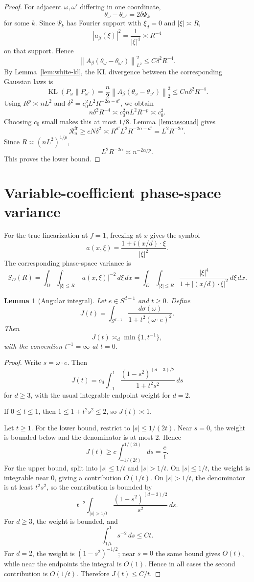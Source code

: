 \documentclass[12pt]{article}
\newtheorem{lemma}[theorem]{Lemma}
\theoremstyle{remark}
\DeclareMathOperator{\KL}{KL}
\newcommand{\norm}[1]{\left\lVert #1\right\rVert}
\newcommand{\asym}{\asymp}
\begin{document}
\begin{proof}
For adjacent \(\omega,\omega'\) differing in one coordinate,
\[
\theta_\omega-\theta_{\omega'}=2\delta\Psi_k
\]
for some \(k\). Since \(\Psi_k\) has Fourier support with \(\xi_d=0\) and \(|\xi|\asym R\),
\[
|a_\beta(\xi)|^2
=
\frac1{|\xi|^4}
\asym R^{-4}
\]
on that support. Hence
\[
\norm{A_\beta(\theta_\omega-\theta_{\omega'})}_{L^2}^2
\le
C\delta^2R^{-4}.
\]
By Lemma~\ref{lem:white-kl}, the KL divergence between the corresponding Gaussian laws is
\[
\KL(P_\omega\|P_{\omega'})
=
\frac n2
\norm{A_\beta(\theta_\omega-\theta_{\omega'})}_2^2
\le
C n\delta^2R^{-4}.
\]
Using \(R^p\asym nL^2\) and \(\delta^2=c_0^2L^2R^{-2\alpha-d'}\), we obtain
\[
n\delta^2R^{-4}
\asym
c_0^2 nL^2R^{-p}
\asym
c_0^2.
\]
Choosing \(c_0\) small makes this at most \(1/8\). Lemma~\ref{lem:assouad} gives
\[
\mathcal R_n^{\mathrm{fr}}
\ge
cN\delta^2
\asym
R^{d'}L^2R^{-2\alpha-d'}
=
L^2R^{-2\alpha}.
\]
Since \(R\asym (nL^2)^{1/p}\),
\[
L^2R^{-2\alpha}
\asym
n^{-2\alpha/p}.
\]
This proves the lower bound.
\end{proof}

\section{Variable-coefficient phase-space variance}
\label{sec:variable-variance}

For the true linearization at \(f=1\), freezing at \(x\) gives the symbol
\[
a(x,\xi)=\frac{1+i(x/d)\cdot\xi}{|\xi|^2}.
\]
The corresponding phase-space variance is
\[
S_D(R)
=
\int_D\int_{|\xi|\le R}
|a(x,\xi)|^{-2}\,d\xi\,dx
=
\int_D\int_{|\xi|\le R}
\frac{|\xi|^4}{1+|(x/d)\cdot\xi|^2}\,d\xi\,dx.
\]

\begin{lemma}[Angular integral]
\label{lem:angular-integral}
Let \(e\in S^{d-1}\) and \(t\ge0\). Define
\[
J(t)=\int_{S^{d-1}}\frac{d\sigma(\omega)}{1+t^2(\omega\cdot e)^2}.
\]
Then
\[
J(t)\asym_d \min\{1,t^{-1}\},
\]
with the convention \(t^{-1}=\infty\) at \(t=0\).
\end{lemma}
\begin{proof}
Write \(s=\omega\cdot e\). Then
\[
J(t)=c_d\int_{-1}^1
\frac{(1-s^2)^{(d-3)/2}}{1+t^2s^2}\,ds
\]
for \(d\ge3\), with the usual integrable endpoint weight for \(d=2\).

If \(0\le t\le1\), then \(1\le1+t^2s^2\le2\), so \(J(t)\asym1\).

Let \(t\ge1\). For the lower bound, restrict to \(|s|\le1/(2t)\). Near \(s=0\), the weight is bounded below and the denominator is at most \(2\). Hence
\[
J(t)\ge c\int_{-1/(2t)}^{1/(2t)}ds=\frac{c}{t}.
\]
For the upper bound, split into \(|s|\le1/t\) and \(|s|>1/t\). On \(|s|\le1/t\), the weight is integrable near \(0\), giving a contribution \(O(1/t)\). On \(|s|>1/t\), the denominator is at least \(t^2s^2\), so the contribution is bounded by
\[
t^{-2}\int_{|s|>1/t}
\frac{(1-s^2)^{(d-3)/2}}{s^2}\,ds.
\]
For \(d\ge3\), the weight is bounded, and
\[
\int_{1/t}^1s^{-2}\,ds\le Ct.
\]
For \(d=2\), the weight is \((1-s^2)^{-1/2}\); near \(s=0\) the same bound gives \(O(t)\), while near the endpoints the integral is \(O(1)\). Hence in all cases the second contribution is \(O(1/t)\). Therefore \(J(t)\le C/t\).
\end{proof}
\end{document}
